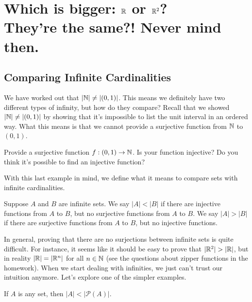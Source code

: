 \chapter[Infinite Cardinality]{Which is bigger: $\mathbb{R}$ or $\mathbb{R}^2$?\\
They're the same?!  Never mind then.  }




\section{Comparing Infinite Cardinalities}

We have worked out that $|\mathbb{N}| \neq |(0,1)|$.  This means we definitely have two different types of infinity, but how do they compare?  Recall that we showed $|\mathbb{N}| \neq |(0,1)|$ by showing that it's impossible to list the unit interval in an ordered way.  What this means is that we cannot provide a surjective function from $\mathbb{N}$ to $(0,1)$.  

	\begin{question}
	\item Provide a surjective function $f:(0,1) \to \mathbb{N}$.  Is your function injective?  Do you think it's possible to find an injective function?
	
	\vspace{1.5in}
	\end{question}
	
With this last example in mind, we define what it means to compare sets with infinite cardinalities.

\begin{definition}  Suppose $A$ and $B$ are infinite sets.  We say $|A|<|B|$ if there are injective functions from $A$ to $B$, but no surjective functions from $A$ to $B$.  We say $|A|>|B|$ if there are surjective functions from $A$ to $B$, but no injective functions.
\end{definition}

In general, proving that there are no surjections between infinite sets is quite difficult.  For instance,  it seems like it should be easy to prove that $|\R^2|>|\R|$, but in reality $|\mathbb{R}|=|\mathbb{R}^n|$ for all $n \in \mathbb{N}$ (see the questions about zipper functions in the homework).  When we start dealing with infinities, we just can't trust our intuition anymore.  Let's explore one of the simpler examples.

\begin{claim}  If $A$ is any set, then $|A|< |\mathscr{P}(A)|$.
\end{claim}

